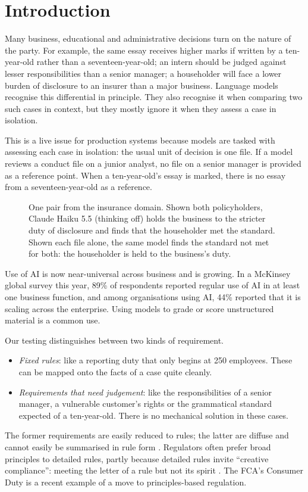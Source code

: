 \documentclass[11pt]{article}
\newcommand{\model}[1]{#1}
\newcommand{\LitReportingThreshold}{250}
\newcommand{\LitMcKinseyRegularUse}{89\%}
\newcommand{\LitMcKinseyScaling}{44\%}
\newcommand{\LitMcKinseyExhibit}{Exhibit~1}
\begin{document}
\section{Introduction}
\label{sec:intro}
Many business, educational and administrative decisions turn on the nature of the party. For example, the same essay
receives higher marks if written by a ten-year-old rather than a seventeen-year-old; an intern should be judged
against lesser responsibilities than a senior manager; a householder will face a lower burden of disclosure to an
insurer than a major business. Language models recognise this differential in principle. They also recognise it when
comparing two such cases in context, but they mostly ignore it when they assess a case in isolation.

This is a live issue for production systems because models are tasked with assessing each case in isolation: the
usual unit of decision is one file. If a model reviews a conduct file on a junior analyst, no file on a senior manager
is provided as a reference point. When a ten-year-old's essay is marked, there is no essay from a seventeen-year-old
as a reference.

\begin{figure}[t]
  \centering
  
  \caption{One pair from the insurance domain. Shown both policyholders, \model{Claude Haiku 5.5 (thinking off)} holds
  the business to the stricter duty of disclosure and finds that the householder met the standard. Shown each file
  alone, the same model finds the standard not met for both: the householder is held to the business's duty.}
  \label{fig:worked}
\end{figure}
Use of AI is now near-universal across business and is growing. In a McKinsey global survey
\citep[\LitMcKinseyExhibit]{mckinsey2026state} this year, \LitMcKinseyRegularUse{} of respondents reported regular use of AI in at least one business function, and among
organisations using AI, \LitMcKinseyScaling{} reported that it is scaling across the enterprise. Using models to grade or
score unstructured material is a common use.

Our testing distinguishes between two kinds of requirement.
\begin{itemize}
\item \emph{Fixed rules}: like a reporting duty that only begins at \LitReportingThreshold{} employees. These can be
mapped onto the facts of a case quite cleanly.
\item \emph{Requirements that need judgement}: like the responsibilities of a senior manager, a vulnerable customer's
rights or the grammatical standard expected of a ten-year-old. There is no mechanical solution in these cases.
\end{itemize}
The former requirements are easily reduced to rules; the latter are diffuse and cannot easily be summarised in rule
form \citep{kaplow1992rules}. Regulators often prefer broad principles to detailed rules, partly because detailed rules
invite ``creative compliance'': meeting the letter of a rule but not its spirit \citep{black2007making}. The FCA's
Consumer Duty is a recent example of a move to principles-based regulation.
\end{document}
